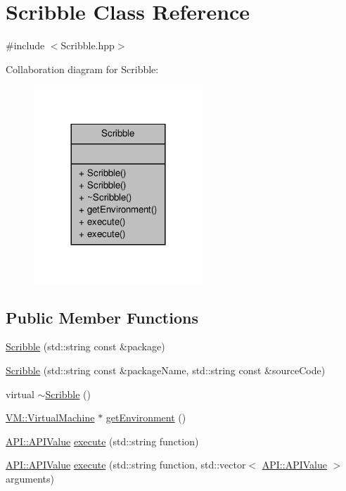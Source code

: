 \hypertarget{class_scribble}{\section{Scribble Class Reference}
\label{class_scribble}
}


{\ttfamily \#include $<$Scribble.\-hpp$>$}



Collaboration diagram for Scribble\-:
\nopagebreak
\begin{figure}[H]
\begin{center}
\leavevmode
\includegraphics[width=180pt]{class_scribble__coll__graph}
\end{center}
\end{figure}
\subsection*{Public Member Functions}
\begin{DoxyCompactItemize}
\item 
\hyperlink{class_scribble_a202c6998a7d53bb572da33e3063aa73f}{Scribble} (std\-::string const \&package)
\item 
\hyperlink{class_scribble_a174060addf8e273bd01df97cee8de493}{Scribble} (std\-::string const \&package\-Name, std\-::string const \&source\-Code)
\item 
virtual \hyperlink{class_scribble_ac51764f36c9a2b7564babacd412253c5}{$\sim$\-Scribble} ()
\item 
\hyperlink{class_v_m_1_1_virtual_machine}{V\-M\-::\-Virtual\-Machine} $\ast$ \hyperlink{class_scribble_ab4eb803a6ddfdba61656a2a8dd56b777}{get\-Environment} ()
\item 
\hyperlink{class_a_p_i_1_1_a_p_i_value}{A\-P\-I\-::\-A\-P\-I\-Value} \hyperlink{class_scribble_ade95d568ada3bdcbfc561914cdf04912}{execute} (std\-::string function)
\item 
\hyperlink{class_a_p_i_1_1_a_p_i_value}{A\-P\-I\-::\-A\-P\-I\-Value} \hyperlink{class_scribble_aa540843227946815a077ae1ae9b65b8d}{execute} (std\-::string function, std\-::vector$<$ \hyperlink{class_a_p_i_1_1_a_p_i_value}{A\-P\-I\-::\-A\-P\-I\-Value} $>$ arguments)
\end{DoxyCompactItemize}


